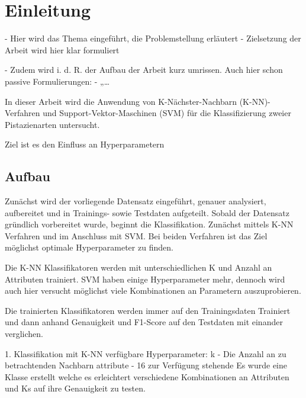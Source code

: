 
\section{Einleitung}

- Hier wird das Thema eingeführt, die Problemstellung erläutert 
- Zielsetzung der Arbeit wird hier klar formuliert

- Zudem wird i. d. R. der Aufbau der Arbeit kurz umrissen.
Auch hier schon passive Formulierungen:
- „…


In dieser Arbeit wird die Anwendung von K-Nächster-Nachbarn (K-NN)-Verfahren und Support-Vektor-Maschinen (SVM) für die Klassifizierung zweier Pistazienarten untersucht. 

Ziel ist es den Einfluss an Hyperparametern 

\subsection{Aufbau}
Zunächst wird der vorliegende Datensatz eingeführt, genauer analysiert, aufbereitet und in Trainings- sowie Testdaten aufgeteilt.
Sobald der Datensatz gründlich vorbereitet wurde, beginnt die Klassifikation.
Zunächst mittels K-NN Verfahren und im Anschluss mit SVM.
Bei beiden Verfahren ist das Ziel möglichst optimale Hyperparameter zu finden.

Die K-NN Klassifikatoren werden mit unterschiedlichen \glqq{}K\grqq{} und Anzahl an Attributen trainiert. 
SVM haben einige Hyperparameter mehr, dennoch wird auch hier versucht möglichst viele Kombinationen an Parametern auszuprobieren.

Die trainierten Klassifikatoren werden immer auf den Trainingsdaten Trainiert und dann anhand Genauigkeit und F1-Score auf den Testdaten mit einander verglichen.





1. Klassifikation mit K-NN
verfügbare Hyperparameter:
 k - Die Anzahl an zu betrachtenden Nachbarn
 attribute - 16 zur Verfügung stehende
Es wurde eine Klasse erstellt welche es erleichtert verschiedene Kombinationen an Attributen und Ks auf ihre Genauigkeit zu testen. 
